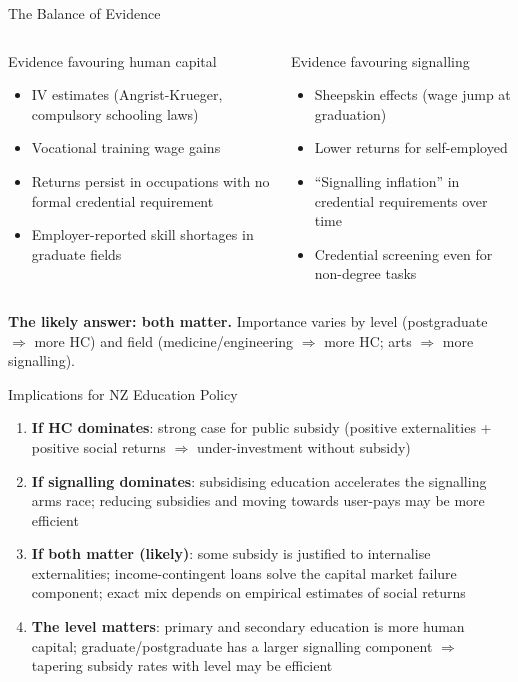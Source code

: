 \documentclass[aspectratio=169, 12pt]{beamer}
\begin{document}
\begin{frame}{The Balance of Evidence}
  \begin{columns}
      \begin{block}{Evidence favouring human capital}
        \footnotesize
        \begin{itemize}
          \item IV estimates (Angrist-Krueger, compulsory schooling laws)
          \item Vocational training wage gains
          \item Returns persist in occupations with no formal credential requirement
          \item Employer-reported skill shortages in graduate fields
        \end{itemize}
      \end{block}
      \begin{alertblock}{Evidence favouring signalling}
        \footnotesize
        \begin{itemize}
          \item Sheepskin effects (wage jump at graduation)
          \item Lower returns for self-employed
          \item ``Signalling inflation'' in credential requirements over time
          \item Credential screening even for non-degree tasks
        \end{itemize}
      \end{alertblock}
  \end{columns}
  \vspace{0.3em}
  \footnotesize \textbf{The likely answer: both matter.} Importance varies by level (postgraduate $\Rightarrow$ more HC) and field (medicine/engineering $\Rightarrow$ more HC; arts $\Rightarrow$ more signalling).
\end{frame}

\begin{frame}{Implications for NZ Education Policy}
  \small
  \begin{enumerate}
    \item \textbf{If HC dominates}: strong case for public subsidy (positive externalities +
          positive social returns $\Rightarrow$ under-investment without subsidy)
    \item \textbf{If signalling dominates}: subsidising education accelerates the signalling
          arms race; reducing subsidies and moving towards user-pays may be more efficient
    \item \textbf{If both matter (likely)}: some subsidy is justified to internalise
          externalities; income-contingent loans solve the capital market failure component;
          exact mix depends on empirical estimates of social returns
    \item \textbf{The level matters}: primary and secondary education is more human capital;
          graduate/postgraduate has a larger signalling component
          $\Rightarrow$ tapering subsidy rates with level may be efficient
  \end{enumerate}
\end{frame}
\end{document}
